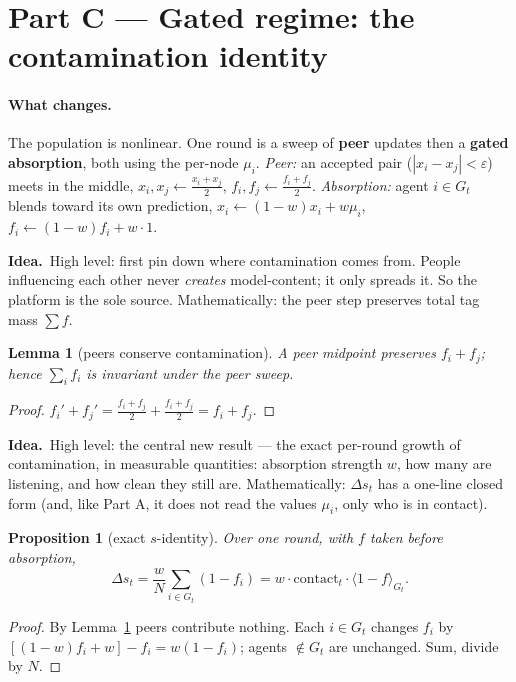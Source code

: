 \documentclass[11pt]{article}
\newtheorem{lemma}{Lemma}
\newtheorem{proposition}{Proposition}
\theoremstyle{definition}
\newcommand{\idea}[1]{\par\medskip\noindent\textbf{Idea.}\ #1\par\medskip}
\begin{document}
\section{Part C --- Gated regime: the contamination identity}

\paragraph{What changes.} The population is nonlinear. One round is a sweep of
\textbf{peer} updates then a \textbf{gated absorption}, both using the per-node $\mu_i$.
\emph{Peer:} an accepted pair ($|x_i-x_j|<\varepsilon$) meets in the middle,
$x_i,x_j\leftarrow\tfrac{x_i+x_j}2$, $f_i,f_j\leftarrow\tfrac{f_i+f_j}2$.
\emph{Absorption:} agent $i\in G_t$ blends toward its own prediction,
$x_i\leftarrow(1-w)x_i+w\mu_i$, $f_i\leftarrow(1-w)f_i+w\cdot1$.

\idea{High level: first pin down where contamination comes from. People influencing
each other never \emph{creates} model-content; it only spreads it. So the platform is
the sole source. Mathematically: the peer step preserves total tag mass $\sum f$.}

\begin{lemma}[peers conserve contamination]\label{lem:peer}
A peer midpoint preserves $f_i+f_j$; hence $\sum_i f_i$ is invariant under the peer sweep.
\end{lemma}
\begin{proof}$f_i'+f_j'=\tfrac{f_i+f_j}2+\tfrac{f_i+f_j}2=f_i+f_j$.\end{proof}

\idea{High level: the central new result --- the exact per-round growth of
contamination, in measurable quantities: absorption strength $w$, how many are
listening, and how clean they still are. Mathematically: $\Delta s_t$ has a one-line
closed form (and, like Part A, it does not read the values $\mu_i$, only who is in
contact).}

\begin{proposition}[exact $s$-identity]\label{prop:ds}
Over one round, with $f$ taken before absorption,
\begin{equation}\label{eq:ds}
\Delta s_t=\frac{w}{N}\sum_{i\in G_t}(1-f_i)
=w\cdot\mathrm{contact}_t\cdot\langle 1-f\rangle_{G_t}.
\end{equation}
\end{proposition}
\begin{proof}
By Lemma~\ref{lem:peer} peers contribute nothing. Each $i\in G_t$ changes $f_i$ by
$[(1-w)f_i+w]-f_i=w(1-f_i)$; agents $\notin G_t$ are unchanged. Sum, divide by $N$.
\end{proof}
\end{document}
